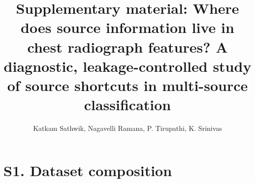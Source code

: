 \documentclass[12pt]{article}
\begin{document}
\title{Supplementary material: Where does source information live in chest radiograph features? A diagnostic, leakage-controlled study of source shortcuts in multi-source classification}
\author{Katkam Sathwik, Nagavelli Ramana, P. Tirupathi, K. Srinivas}
\date{}
\maketitle

\section*{S1. Dataset composition}

\end{document}
